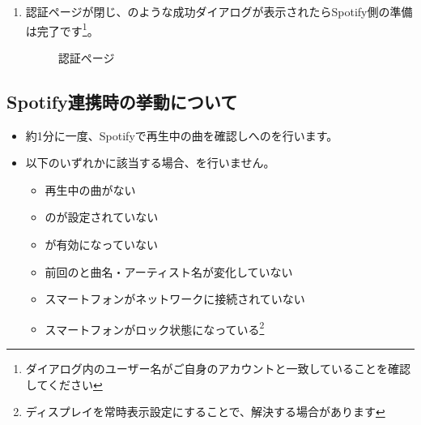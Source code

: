 \begin{enumerate}
            \newpage
            \item 認証ページが閉じ、のような成功ダイアログが表示されたらSpotify側の準備は完了です\footnote{ダイアログ内のユーザー名がご自身のアカウントと一致していることを確認してください}。
                \begin{figure}[htbp]
                    \centering
                    \caption{認証ページ}
                    \label{img:spotify14}
                \end{figure}
        \end{enumerate}

    \newpage
    \subsection{Spotify連携時の挙動について}
    \label{sec:spotify7}
    \begin{itemize}
        \item 約1分に一度、Spotifyで再生中の曲を確認し\mi への\nowplaying を行います。
        \item 以下のいずれかに該当する場合、\nowplaying を行いません。
        \begin{itemize}
            \item 再生中の曲がない
            \item \mi の\accessToken が設定されていない
            \item \nowplaying が有効になっていない
            \item 前回の\nowplaying と曲名・アーティスト名が変化していない
            \item スマートフォンがネットワークに接続されていない
            \item スマートフォンがロック状態になっている\footnote{ディスプレイを常時表示設定にすることで、解決する場合があります}
        \end{itemize}
    \end{itemize}

